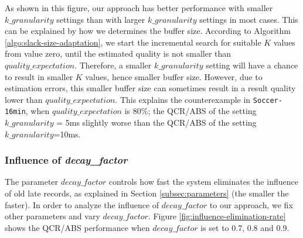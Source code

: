 \documentclass[a4paper, 11pt, twoside]{report}
\begin{document}
As shown in this figure, our approach has better performance with smaller $k\_granularity$ settings than with larger $k\_granularity$ settings in most cases. This can be explained by how we determines the buffer size. According to Algorithm \ref{algo:slack-size-adaptation}, we start the incremental search for suitable $K$ values from value zero, until the estimated quality is not smaller than $quality\_expectation$. Therefore, a smaller $k\_granularity$ setting will have a chance to result in smaller $K$ values, hence smaller buffer size. However, due to estimation errors, this smaller buffer size can sometimes result in a result quality lower than $quality\_expectation$. This explains the counterexample in \texttt{Soccer-16min}, when $quality\_expectation$ is 80\%; the QCR/ABS of the setting $k\_granularity$ = 5ms slightly worse than the QCR/ABS of the setting $k\_granularity$=10ms.\\

\clearpage

\subsubsection{Influence of \textit{decay\_factor}}
\label{subsec:influence-elimination-rate}

The parameter $decay\_factor$ controls how fast the system eliminates the influence of old late records, as explained in Section \ref{subsec:parameters} (the smaller the faster). In order to analyze the influence of $decay\_factor$ to our approach, we fix other parameters and vary $decay\_factor$. Figure \ref{fig:influence-elimination-rate} shows the QCR/ABS performance when $decay\_factor$ is set to 0.7, 0.8 and 0.9.\\
\end{document}
